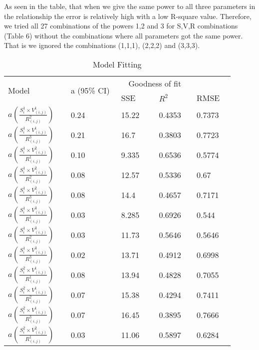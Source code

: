 \documentclass[10pt]{article}
\begin{document}
As seen in the table, that when we give the same power to all three parameters in the relationship the error is relatively high with a low R-square value. Therefore, we tried all 27 combinations of the powers 1,2 and 3 for S,V,R combinations (Table 6) without the combinations where all parameters got the same power. That is we ignored the combinations (1,1,1), (2,2,2) and (3,3,3). 
\begin{center}
\begin{table}[H]
\caption{Model Fitting}
\begin{center}
\begin{adjustbox}{width=0.5\textwidth} 
\begin{tabular}{|p{0.25\linewidth}|p{0.2\linewidth}|p{0.15\linewidth}|p{0.15\linewidth}|p{0.15\linewidth}|} 
\hline
\multirow{2}{*}{Model}&\multirow{2}{*}{a (95\% CI)}& \multicolumn{2}{c}{Goodness of fit} &\\   \cline{3-5}
& & SSE& $R^2$& RMSE\\
\hline
 $a(  \frac{S_{i}^1 \times V_{(i,j)}^1}{R_{(i,j)}^2})$ & 0.24 & 15.22 & 0.4353 & 0.7373\\
\hline
 $a(  \frac{S_{i}^1 \times V_{(i,j)}^1}{R_{(i,j)}^3}) $ & 0.21 & 16.7  & 0.3803 & 0.7723 \\
\hline
 $a(  \frac{S_{i}^1 \times V_{(i,j)}^2}{R_{(i,j)}^1})$ & 0.10 & 9.335 & 0.6536 & 0.5774 \\
\hline
$a(  \frac{S_{i}^1 \times V_{(i,j)}^2}{R_{(i,j)}^2})$ & 0.08 & 12.57 & 0.5336 & 0.67 \\
\hline
$a(  \frac{S_{i}^1 \times V_{(i,j)}^2}{R_{(i,j)}^3})$ & 0.08 & 14.4 & 0.4657 & 0.7171\\
\hline
$a(  \frac{S_{i}^1 \times V_{(i,j)}^3}{R_{(i,j)}^1})$ & 0.03 & 8.285 & 0.6926 & 0.544 \\
\hline
$a(  \frac{S_{i}^1 \times V_{(i,j)}^3}{R_{(i,j)}^2})$ & 0.03 & 11.73 & 0.5646 & 0.5646 \\
\hline
 $a(  \frac{S_{i}^1 \times V_{(i,j)}^3}{R_{(i,j)}^3})$ & 0.02 & 13.71 & 0.4912 & 0.6998 \\
\hline
 $a(  \frac{S_{i}^2 \times V_{(i,j)}^1}{R_{(i,j)}^1})$ & 0.08 & 13.94 & 0.4828 & 0.7055 \\
\hline
 $a(  \frac{S_{i}^2 \times V_{(i,j)}^1}{R_{(i,j)}^2})$ & 0.07 & 15.38 & 0.4294 & 0.7411  \\
\hline
$a(  \frac{S_{i}^2 \times V_{(i,j)}^1}{R_{(i,j)}^3})$ & 0.07 & 16.45 & 0.3895 & 0.7666  \\
\hline
 $a(  \frac{S_{i}^2 \times V_{(i,j)}^2}{R_{(i,j)}^1})$ & 0.03 & 11.06 & 0.5897 &  0.6284 \\

\end{tabular}
\end{adjustbox}
\end{center}
\end{table}
\end{center}
\end{document}
